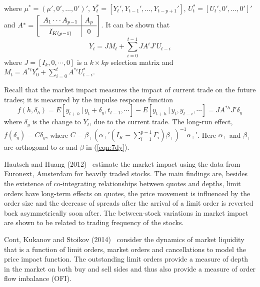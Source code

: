 where $\mu^*=(\mu',0',\ldots,0')'$, $Y_t^*=[Y_t',Y_{t-1}',\ldots,Y_{t-p+1}']$, $U_t^*=[U_t',0',\ldots,0']'$ and $A^*=\renewcommand\arraystretch{1.3} \mleft[ \begin{array}{c|c} A_1\cdots A_{p-1} & A_p \\ \hline I_{K(p-1)} & 0 \end{array} \mright]$. It can be shown that 
	\begin{equation}\label{eqn:7anotherlargeyt}
	Y_t= JM_t + \sum_{i=0}^{t-1} JA^i J' U_{t-i}
	\end{equation}
where $J=[I_k,0,\cdots,0]$ is a $k\times kp$ selection matrix and $M_t= A^{*t} Y_0^* + \sum_{i=0}^t A^{*i}U_{t-i}^*$.

Recall that the market impact measures the impact of current trade on the future trades; it is measured by the impulse response function
	\begin{equation}\label{eqn:impulserep}
	f(h,\delta_h) = E[y_{t+h}\,|\, y_t+\delta_y,t_{t-1},\cdots] - E[y_{t+h} \,|\, y_t,y_{t-i},\cdots] = JA^{*h} J' \delta_y
	\end{equation}
where $\delta_y$ is the change to $Y_t$, due to the current trade. The long-run effect, $f(\delta_y)=C \delta_y$, where $C=\beta_\perp(\alpha_\perp'(I_K - \sum_{i=1}^{p-1} \Gamma_i ) \beta_\perp )^{-1} \alpha_\perp'$. Here $\alpha_\perp$ and $\beta_\perp$ are orthogonal to $\alpha$ and $\beta$ in (\ref{eqn:7dy}).


Hautsch and Huang (2012)~\cite{hauthuang} estimate the market impact using the data from Euronext, Amsterdam for heavily traded stocks. The main findings are, besides the existence of co-integrating relationships between quotes and depths, limit orders have long-term effects on quotes, the price movement is influenced by the order size and the decrease of spreads after the arrival of a limit order is reverted back asymmetrically soon after. The between-stock variations in market impact are shown to be related to trading frequency of the stocks. 


Cont, Kukanov and Stoikov (2014)~\cite{contkulst} consider the dynamics of market liquidity that is a function of limit orders, market orders and cancellations to model the price impact function. The outstanding limit orders provide a measure of depth in the market on both buy and sell sides and thus also provide a measure of order flow imbalance (OFI).


